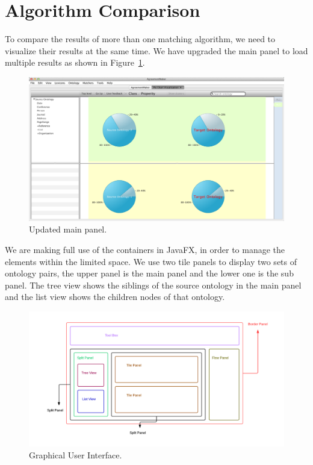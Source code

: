 \section{Algorithm Comparison}

To compare the results of more than one matching algorithm, we need to
visualize their results at the same time. We have upgraded the main
panel to load  multiple results as shown in
Figure~\ref{fig:updated_main_panel}. %


\begin{figure}[!ht]
	\centering
	\includegraphics[width=6.5in]{pics/gui2.png}
	\caption{Updated main panel.}
	\label{fig:updated_main_panel}
\end{figure}

We are making full use of the containers in JavaFX, in order to manage
the elements within the limited space. We use two tile panels to display two
sets of ontology pairs, the upper panel is the main panel and the
lower one is the sub panel. The tree view shows the siblings of the
source ontology in the main panel and the list view shows the children
nodes of that ontology. 

\begin{figure}[!ht]
	\centering
	\includegraphics[width=6.5in]{pics/VA_UI.png}
	\caption{Graphical User Interface.}
	\label{fig:ui}
\end{figure}

